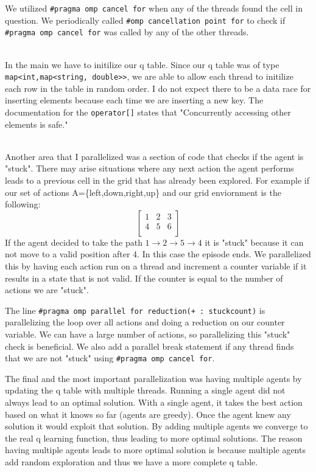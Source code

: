 \documentclass[12pt]{article}
\begin{document}
We utilized \verb|#pragma omp cancel for| 
when any of the threads found the cell in question. We periodically 
called \verb|#omp cancellation point for| to check if \verb|#pragma omp cancel for|
was called by any of the other threads. 
~\\~

In the main we have to initilize our q table. Since our
q table was of type \verb|map<int,map<string, double>>|, we are able to 
allow each thread to initilize each row in the table in random order. 
I do not expect there to be a data race for inserting elements
because each time we are inserting a new key. The 
documentation for the \verb|operator[]| states that "Concurrently accessing other elements is safe."
~\\~

Another area that I parallelized was a section of code that checks if the agent
is "stuck". There may arise situations where any next action the agent performs
leads to a previous cell in the grid that has already been explored.
For example if our set of actions A=\{left,down,right,up\} and our grid
enviornment is the following:
\[
  \left[ {\begin{array}{ccc}
    1 & 2 & 3 \\
    4 & 5 & 6 \\ 
  \end{array} } \right]
\]
If the agent decided to take the path $1 \to 2 \to 5 \to 4$ it is 
"stuck" because it can not move to a valid position after 4. In this case the
episode ends. We parallelized this by having each action run on a thread and
increment a counter variable if it results in a state that is not valid.
If the counter is equal to the number of actions we are "stuck". 

The line \verb|#pragma omp parallel for reduction(+ : stuckcount)| 
is parallelizing the loop over all actions and doing a reduction
on our counter variable. We can have a large number of 
actions, so parallelizing this "stuck" check is beneficial.
We also add a parallel break statement if any thread finds 
that we are not "stuck" using \verb|#pragma omp cancel for|.

The final and the most important parallelization was 
having multiple agents by updating the q table with multiple threads. 
Running a single agent did not always lead to 
an optimal solution. With a single agent, it takes the best 
action based on what it knows so far (agents are greedy). 
Once the agent knew any solution it would exploit that solution.
By adding multiple agents we converge to the real q learning function,
thus leading to more optimal solutions. The reason having multiple agents
leads to more optimal solution is because multiple agents add random exploration
and thus we have a more complete q table. 
\end{document}
